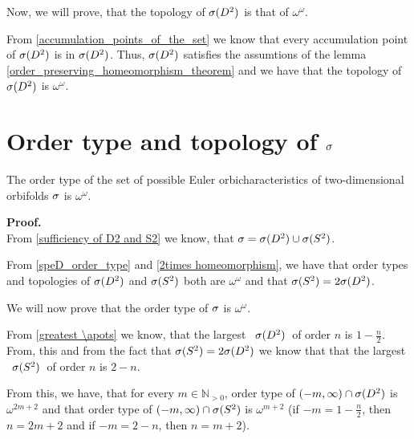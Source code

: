 Now, we will prove, that the topology of ${{\sigma}(D^2)}$ is that of $\omega^\omega$.

From \ref{accumulation_points_of_the_set} we know that every accumulation point 
of ${{\sigma}(D^2)}$ is in ${{\sigma}(D^2)}$. 
Thus, ${{\sigma}(D^2)}$ satisfies the assumtions of the lemma \ref{order_preserving_homeomorphism_theorem} 
and 
we have that 
the topology of ${{\sigma}(D^2)}$ is $\omega^\omega$. 













\section{Order type and topology of ${\sigma}$}
\begin{theorem}
The order type of the set of possible Euler orbicharacteristics of two-dimensional orbifolds 
${\sigma}$ is $\omega^\omega$. 
\end{theorem}
\textbf{Proof.} \\
From \ref{sufficiency of D2 and S2}
we know, that ${\sigma} = {{\sigma}(D^2)} \cup {{\sigma}(S^2)}$.

From \ref{speD_order_type} and \ref{2times homeomorphism}, we have that order types and 
topologies of ${{\sigma}(D^2)}$ and ${{\sigma}(S^2)}$ both are $\omega^\omega$ and that ${{\sigma}(S^2)} = 2{{\sigma}(D^2)}$.  

We will now prove that the order type of ${\sigma}$ is $\omega^\omega$.

From \ref{greatest \apots} we know, that the largest \apots\ ${{\sigma}(D^2)}$\ of order $n$ is 
$1-\frac{n}{2}$. From, this and from the fact that ${{\sigma}(S^2)} = 2{{\sigma}(D^2)}$ we know that 
that the largest \apots\ ${{\sigma}(S^2)}$\ of order $n$ is 
$2-n$. 

From this, we have, that for every $m \in \mathbb{N}_{>0}$, order type of 
$(-m, \infty) \cap {{\sigma}(D^2)}$ is $\omega^{2m+2}$ and that order type 
of $(-m, \infty) \cap {{\sigma}(S^2)}$ is $\omega^{m+2}$ (if $-m = 1-\frac{n}{2}$, then 
$n = 2m + 2$ and 
if $-m = 2 - n$, then $n = m + 2$). 


